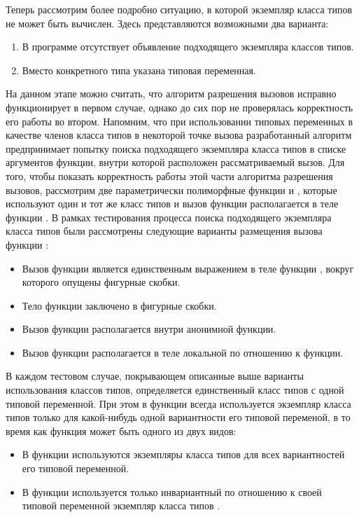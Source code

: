 Теперь рассмотрим более подробно ситуацию, в которой экземпляр класса типов не может быть вычислен. Здесь представляются возможными два варианта:
\begin{enumerate}
    \item В программе отсутствует объявление подходящего экземпляра классов типов.  
    \item Вместо конкретного типа указана типовая переменная.  
\end{enumerate}
На данном этапе можно считать, что алгоритм разрешения вызовов исправно функционирует в первом случае, однако до сих пор не проверялась корректность его работы во втором. Напомним, что при использовании типовых переменных в качестве членов класса типов в некоторой точке вызова разработанный алгоритм предпринимает попытку поиска подходящего экземпляра класса типов в списке аргументов функции, внутри которой расположен рассматриваемый вызов. Для того, чтобы показать корректность работы этой части алгоритма разрешения вызовов, рассмотрим две параметрически полиморфные функции  и , которые используют один и тот же класс типов и вызов функции  располагается в теле функции . В рамках тестирования процесса поиска подходящего экземпляра класса типов были рассмотрены следующие варианты размещения вызова функции :
\begin{itemize}
    \item Вызов функции  является единственным выражением в теле функции , вокруг которого опущены фигурные скобки. 
    \item Тело функции  заключено в фигурные скобки. 
    \item Вызов функции  располагается внутри анонимной функции.
    \item Вызов функции  располагается в теле локальной по отношению к  функции. 
\end{itemize}
В каждом тестовом случае, покрывающем описанные выше варианты использования классов типов, определяется единственный класс типов  с одной типовой переменной. При этом в функции  всегда используется экземпляр класса типов  только для какой-нибудь одной вариантности его типовой переменой, в то время как функция  может быть одного из двух видов:
\begin{itemize}
    \item В функции  используются экземпляры класса типов  для всех вариантностей его типовой переменной.
    \item В функции  используется только инвариантный по отношению к своей типовой переменной экземпляр класса типов .
\end{itemize}

